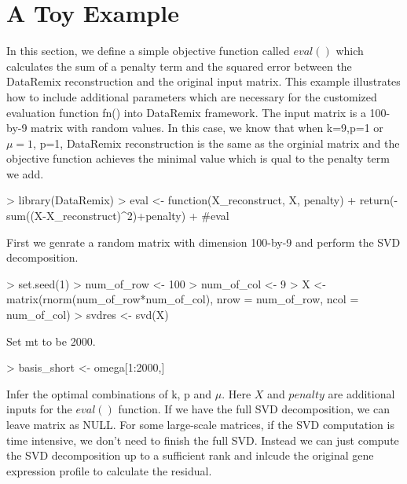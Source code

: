 \documentclass{article}
\begin{document}


\section{A Toy Example}
In this section, we define a simple objective function called $eval()$ which calculates the sum of a penalty term and the squared error between the DataRemix reconstruction and the original input matrix. This example illustrates how to include additional parameters which are necessary for the customized evaluation function fn() into DataRemix framework. The input matrix is a 100-by-9 matrix with random values. In this case, we know that when k=9,p=1 or $\mu=1$, p=1, DataRemix reconstruction is the same as the orginial matrix and the objective function achieves the minimal value which is qual to the penalty term we add. 
\begin{Schunk}
\begin{Sinput}
> library(DataRemix)
> eval <- function(X_reconstruct, X, penalty){
+   return(-sum((X-X_reconstruct)^2)+penalty)
+ }#eval
\end{Sinput}
\end{Schunk}
First we genrate a random matrix with dimension 100-by-9 and perform the SVD decomposition.
\begin{Schunk}
\begin{Sinput}
> set.seed(1)
> num_of_row <- 100
> num_of_col <- 9
> X <- matrix(rnorm(num_of_row*num_of_col), nrow = num_of_row, ncol = num_of_col)
> svdres <- svd(X)
\end{Sinput}
\end{Schunk}
Set mt to be 2000.
\begin{Schunk}
\begin{Sinput}
> basis_short <- omega[1:2000,]
\end{Sinput}
\end{Schunk}
Infer the optimal combinations of k, p and $\mu$. Here $X$ and $penalty$ are additional inputs for the $eval()$ function. If we have the full SVD decomposition, we can leave matrix as NULL. For some large-scale matrices, if the SVD computation is time intensive, we don't need to finish the full SVD. Instead we can just compute the SVD decomposition up to a sufficient rank and inlcude the original gene expression profile to calculate the residual.
\end{document}
